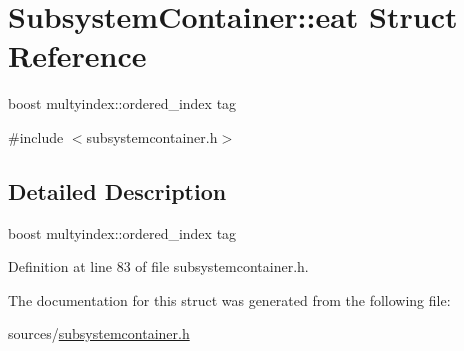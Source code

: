 \hypertarget{structSubsystemContainer_1_1eat}{
\section{SubsystemContainer::eat Struct Reference}
\label{structSubsystemContainer_1_1eat}
}


boost multyindex::ordered\_\-index tag  




{\ttfamily \#include $<$subsystemcontainer.h$>$}



\subsection{Detailed Description}
boost multyindex::ordered\_\-index tag 

Definition at line 83 of file subsystemcontainer.h.



The documentation for this struct was generated from the following file:\begin{DoxyCompactItemize}
\item 
sources/\hyperlink{subsystemcontainer_8h}{subsystemcontainer.h}\end{DoxyCompactItemize}
